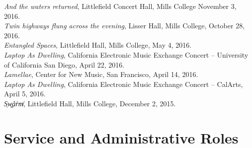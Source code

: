 \documentclass[12pt, a4paper]{article}
\newcommand{\years}[1]{\leavevmode\marginnote{\scriptsize #1}\ignorespaces}%
\begin{document}
\textit{And the waters returned}, Littlefield Concert Hall, Mills College November 3, 2016.\\
\textit{Twin highways flung across the evening}, Lisser Hall, Mills College, October 28, 2016.\\
\textit{Entangled Spaces}, Littlefield Hall, Mills College, May 4, 2016.\\
\textit{Laptop As Dwelling}, California Electronic Music Exchange Concert – University of California San Diego, April 22, 2016.\\
\textit{Lamellae}, Center for New Music, San Francisco, April 14, 2016. \\
\textit{Laptop As Dwelling}, California Electronic Music Exchange Concert – CalArts, April 5, 2016. \\
\years{2015} \textit{S̜w͚a̎r̍m̸}, Littlefield Hall, Mills College, December 2, 2015.


\section*{Service and Administrative Roles}
\end{document}
